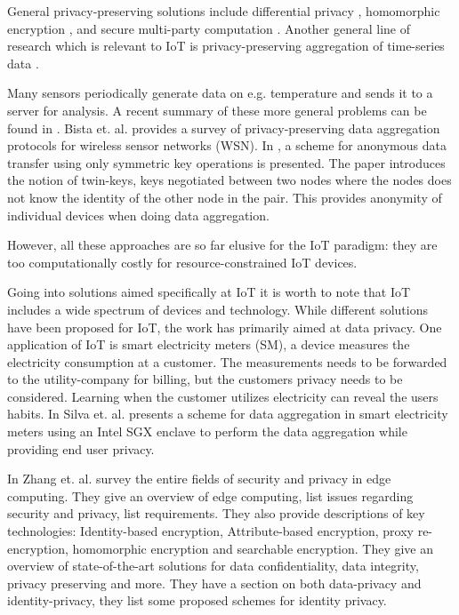 {General privacy-preserving solutions include differential privacy \cite{DworkMNS06}, homomorphic encryption \cite{gentry2009fully}\cite{naehrig2011can}, and secure multi-party computation \cite{bringer2013privacy}. %
Another general line of research which is relevant to IoT is privacy-preserving aggregation of time-series data \cite{JoyeL13}\cite{BenhamoudaJL16}\cite{EmuraKOS18}\cite{ShiCRCS11}.

Many sensors periodically generate data on e.g. temperature and sends it to a server for analysis. A recent summary of these more general problems can be found in \cite{shan2018practical}. Bista et. al. provides a survey of privacy-preserving data aggregation protocols for wireless sensor networks (WSN). In \cite{conti2009privacy}, a scheme for anonymous data transfer using only symmetric key operations is presented. The paper introduces the notion of twin-keys, keys negotiated between two nodes where the nodes does not know the identity of the other node in the pair. This provides anonymity of individual devices when doing data aggregation.

However, all these approaches are so far elusive for the IoT paradigm: they are too computationally costly for resource-constrained IoT devices.  

Going into solutions aimed specifically at IoT it is worth to note that IoT includes a wide spectrum of devices and technology. While different solutions have been proposed for IoT, the work has primarily aimed at data privacy. 
One application of IoT is smart electricity meters (SM), a device measures the electricity consumption at a customer. The measurements needs to be forwarded to the utility-company for billing, but the customers privacy needs to be considered. Learning when the customer utilizes electricity can reveal the users habits. In \cite{Silva:2017:SPP:3019612.3019795} Silva et. al. presents a scheme for data aggregation in smart electricity meters using an Intel SGX enclave to perform the data aggregation while providing end user privacy. 

In \cite{zhang2018data} Zhang et. al. survey the entire fields of security and privacy in edge computing. They give an overview of edge computing, list issues regarding security and privacy, list requirements. They also provide descriptions of key technologies: Identity-based encryption, Attribute-based encryption, proxy re-encryption, homomorphic encryption and searchable encryption. They give an overview of state-of-the-art solutions for data confidentiality, data integrity, privacy preserving and more. They have a section on both data-privacy and identity-privacy, they list some proposed schemes for identity privacy.

}
